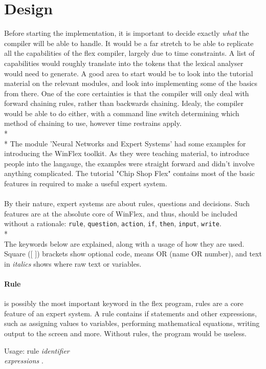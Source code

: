 \documentclass[12pt]{report}
\begin{document}
\section{Design}\label{sec:design}
Before starting the implementation, it is important to decide exactly \textit{what} the compiler will be able to handle.  It would be a far stretch to be able to replicate all the capabilities of the flex compiler, largely due to time constraints.  A list of capabilities would roughly translate into the tokens that the lexical analyser would need to generate.  A good area to start would be to look into the tutorial material on the relevant modules, and look into implementing some of the basics from there.  One of the core certainties is that the compiler will only deal with forward chaining rules, rather than backwards chaining.  Idealy, the compiler would be able to do either, with a command line switch determining which method of chaining to use, however time restrains apply.\\*
\\*
The module 'Neural Networks and Expert Systems' had some examples for introducing the WinFlex toolkit.  As they were teaching material, to introduce people into the langauge, the examples were straight forward and didn't involve anything complicated.  The tutorial "Chip Shop Flex" contains most of the basic features in required to make a useful expert system.
\\
\\
By their nature, expert systems are about rules, questions and decisions.  Such features are at the absolute core of WinFlex, and thus, should be included without a rationale: \texttt{rule}, \texttt{question}, \texttt{action}, \texttt{if}, \texttt{then}, \texttt{input}, \texttt{write}.\\*
\\
The keywords below are explained, along with a usage of how they are used.  Square ([ ]) brackets show optional code, \textbar \space means OR (name OR number), and text in \textit{italics} shows where raw text or variables.
\paragraph{Rule} is possibly the most important keyword in the flex program, rules are a core feature of an expert system.  A rule contains if statements and other expressions, such as assigning values to variables, performing mathematical equations, writing output to the screen and more.  Without rules, the program would be useless.\\
\begin{tabbing}
	Usage: rule \= \textit{identifier}\\
	\> \textit{expressions} .\\
\end{tabbing}
\end{document}
